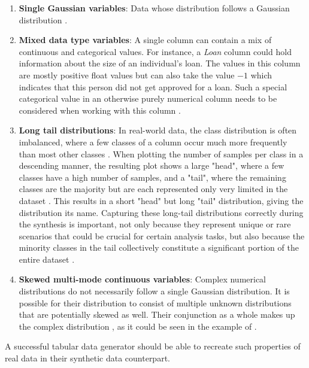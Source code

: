 \begin{enumerate}
    \item \textbf{Single Gaussian variables}: Data whose distribution follows a Gaussian distribution \cite{zhao2022CTABGANEnhancingTabular}.
    \item \textbf{Mixed data type variables}: A single column can contain a mix of continuous and categorical values. 
    For instance, a \textit{Loan} column could hold information about the size of an individual's loan.
    The values in this column are mostly positive float values but can also take the value \textit{$-1$} which indicates that this person did not get approved for a loan.
    Such a special categorical value in an otherwise purely numerical column needs to be considered when working with this column \cite{zhao2022CTABGANEnhancingTabular}.
    \item \textbf{Long tail distributions}: In real-world data, the class distribution is often imbalanced, where a few classes of a column occur much more frequently than most other classes \cite{zhang2023DeepLongTailedLearning}.
    When plotting the number of samples per class in a descending manner, the resulting plot shows a large "head", where a few classes have a high number of samples, and a "tail", where the remaining classes are the majority but are each represented only very limited in the dataset \cite[p. 2]{zhang2023DeepLongTailedLearning}.
    This results in a short "head" but long "tail" distribution, giving the distribution its name.
    Capturing these long-tail distributions correctly during the synthesis is important, not only because they represent unique or rare scenarios that could be crucial for certain analysis tasks, but also because the minority classes in the tail collectively constitute a significant portion of the entire dataset \cite{zhou2018DeepSuperclassLearning}. 
    \item \textbf{Skewed multi-mode continuous variables}: Complex numerical distributions do not necessarily follow a single Gaussian distribution.
    It is possible for their distribution to consist of multiple unknown distributions that are potentially skewed as well. 
    Their conjunction as a whole makes up the complex distribution \cite{zhao2022CTABGANEnhancingTabular}, as it could be seen in the example of .
\end{enumerate}

A successful tabular data generator should be able to recreate such properties of real data in their synthetic data counterpart.


